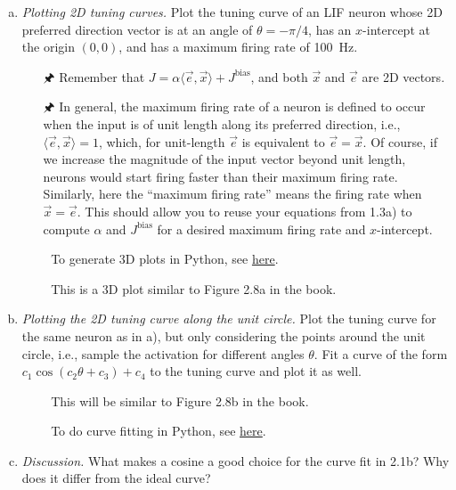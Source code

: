 	\begin{enumerate}[a)]
		\item {} \emph{Plotting 2D tuning curves.} Plot the tuning curve of an LIF neuron whose 2D preferred direction vector is at an angle of $\theta=-\pi/4$, has an $x$-intercept at the origin $(0,0)$, and has a maximum firing rate of \SI{100}{\hertz}.
		\begin{itemize}
			\item[{\symbolfont 🖈}] Remember that $J=\alpha \langle \vec e, \vec x \rangle + J^\mathrm{bias}$, and both $\vec x$ and $\vec e$ are 2D vectors.
			\item[{\symbolfont 🖈}] In general, the maximum firing rate of a neuron is defined to occur when the input is of unit length along its preferred direction, i.e.,~$\langle \vec e, \vec x \rangle = 1$, which, for unit-length $\vec e$ is equivalent to $\vec e = \vec x$. Of course, if we increase the magnitude of the input vector beyond unit length, neurons would start firing faster than their maximum firing rate. Similarly, here the \enquote{maximum firing rate} means the firing rate when $\vec x = \vec e$. This should allow you to reuse your equations from 1.3a) to compute $\alpha$ and $J^\mathrm{bias}$ for a desired maximum firing rate and $x$-intercept.
			\item[{\symbolfont 🐍}] To generate 3D plots in Python, see \href{http://matplotlib.org/mpl_toolkits/mplot3d/tutorial.html}{here}.
			\item[{\symbolfont 📖}] This is a 3D plot similar to Figure 2.8a in the book.
		\end{itemize}
		\item {} \emph{Plotting the 2D tuning curve along the unit circle.} Plot the tuning curve for the same neuron as in a), but only considering the points around the unit circle, i.e., sample the activation for different angles $\theta$. Fit a curve of the form $c_1 \cos(c_2\theta+c_3)+c_4$ to the tuning curve and plot it as well.
		\begin{itemize}
			\item[{\symbolfont 📖}] This will be similar to Figure 2.8b in the book.
			\item[{\symbolfont 🐍}] To do curve fitting in Python, see \href{http://docs.scipy.org/doc/scipy/reference/generated/scipy.optimize.curve_fit.html}{here}.
		\end{itemize}
		\item {} \emph{Discussion.} What makes a cosine a good choice for the curve fit in 2.1b? Why does it differ from the ideal curve?
	\end{enumerate}

